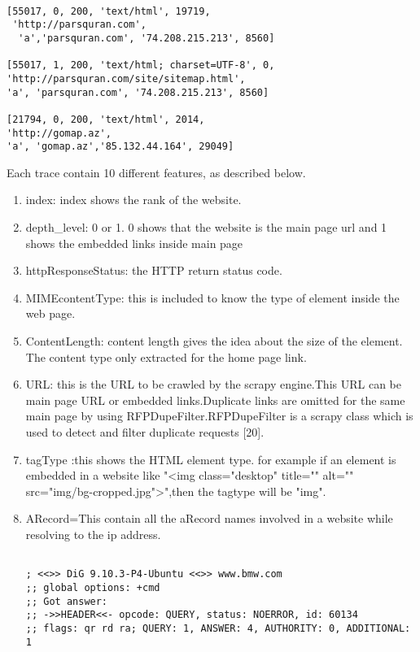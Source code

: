 \begin{lstlisting}[caption= DNS Reply for a host using dig command line tool, label=lst:trace]

[55017, 0, 200, 'text/html', 19719,
 'http://parsquran.com',
  'a','parsquran.com', '74.208.215.213', 8560]

[55017, 1, 200, 'text/html; charset=UTF-8', 0, 
'http://parsquran.com/site/sitemap.html', 
'a', 'parsquran.com', '74.208.215.213', 8560]

[21794, 0, 200, 'text/html', 2014, 
'http://gomap.az', 
'a', 'gomap.az','85.132.44.164', 29049]

\end{lstlisting}

\noindent Each trace contain 10 different features, as described below.\\
\begin{enumerate}
   \item index: index shows the rank of the website.
	\item depth\_level: 0 or 1.
			  0 shows that the website is the main page url and 1 shows the embedded links inside main page 
\item httpResponseStatus: the HTTP return status code.
\item MIMEcontentType: this is included to know the type of element inside the web page.
\item ContentLength: content length gives the idea about the size of the element. The content type only extracted for the home page link.
\item URL: this is the URL to be crawled by the scrapy engine.This URL can be main page URL or embedded links.Duplicate links are omitted for the same main page by using RFPDupeFilter.RFPDupeFilter is a scrapy class which is used to detect and filter duplicate requests [20].
\item tagType :this shows the HTML element type.
		for example if an element is embedded in a website like "<img class="desktop" title="" alt="" src="img/bg-cropped.jpg">",then the tagtype will be "img". 
\item ARecord=This contain all the aRecord names involved in a website while resolving to the ip address.
\begin{lstlisting}[caption= DNS Reply for a host using dig command line tool, label=lst:dig]

; <<>> DiG 9.10.3-P4-Ubuntu <<>> www.bmw.com
;; global options: +cmd
;; Got answer:
;; ->>HEADER<<- opcode: QUERY, status: NOERROR, id: 60134
;; flags: qr rd ra; QUERY: 1, ANSWER: 4, AUTHORITY: 0, ADDITIONAL: 1


\end{lstlisting}
\end{enumerate}
